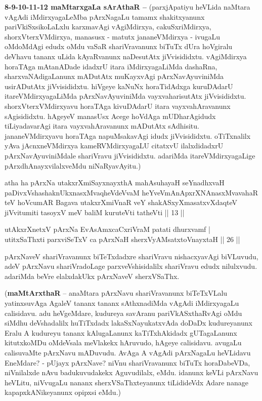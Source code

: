 \begin{artha}
\textbf{8-9-10-11-12 maMtarxgaLa sArAthaR --}
(parxjApatiyu heVLida naMtara vAgAdi iMdirxyagaLeMba pArxNagaLu tamamx shakitxyanunx pariVkiSxsikoLaLxlu karxmavAgi vAgiMdirxya, cakuSxriMdirxya, shorxVterxVMdirxya, manasusx - matutx jananeVMdirxya - ivugaLu oMdoMdAgi edudx oMdu vaSaR shariVravanunx biTuTx dUra hoVgiralu deVhavu tananx uLida kAyaRvanunx naDesutAtx jiVvisididxtu. vAgiMdirxya horaTAga mAtanADade idadxrU itara iMdirxyagaLiMda dashaRna, sharxvaNAdigaLanunx mADutAtx muKayxvAgi pArxNavAyuviniMda usirADutAtx jiVvisididxtu. hiVgeye kaNuNx horaTidAdxga kuruDAdarU itareVMdirxyagaLiMda pArxNavAyuviniMda vayxvaharisutAtx jiVvisididxtu. shorxVterxVMdirxyavu horaTAga kivuDAdarU itara vayxvahAravanunx sAgisididxtu. hAgeyeV manasUsx Acege hoVdAga mUDharAgidudx tiLiyadavarAgi itara vayxvahAravanunx mADutAtx sAdhisitu. jananeVMdirxyavu horaTAga napuMsakavAgi idudx jiVvisididxtu. oTiTxnalilx yAva jAcnxneVMdirxya kameRVMdirxyagaLU citatxvU ilalxdidadxrU pArxNavAyuviniMdale shariVravu jiVvisididxtu. adariMda itareVMdirxyagaLige pArxdhAnayxvilalxveMdu niNaRyavAyitu.)
\end{artha}

\begin{shl}
atha ha pArxNa utakxrXmiSayxnayxthA mahAsuhayaH seYnadhxvaH paDivxVshashaknUkxnasxMvaqheVdeVvaM heYveVmAnApxrXNAnasxMvavahaR teV hoVcumAR Bagava utakxrXmiVnaR veY shakASxyXmasatxvXdaqteV jiVvitumiti tasoyxV meV baliM kuruteVti tatheVti || 13 ||
\end{shl}


\begin{shl}
utAkxrXnetxV pArxNa EvAsAmxcaCxriVraM patati dhurxvamf | \\
utitxSaThxti parxviSeTxV ca pArxNaH sherxVyAMsatxtoV\s nayxtaH \hfill|| 26 || 
\end{shl}

\begin{artha}
pArxNaveV shariVravanunx biTeTxdadxre shariVravu nishacxyavAgi 
biVLuvudu, adeV pArxNavu shariVradoLage parxveVshisidalilx shariVravu 
edudx nilulxvudu. adariMda beVre elalxdakUkx pArxNaveV sherxVSaThx.
\end{artha}

\begin{artha}
(\textbf{maMtArxthaR} -- anaMtara pArxNavu shariVravanunx biTeTxVLalu 
yatinxsuvAga AgaleV tananx tananx sAthxnadiMda vAgAdi iMdirxyagaLu 
calisidavu. adu heVgeMdare, kudureya savAranu pariVkASxthaRvAgi oMdu 
siMdhu deVshadalilx huTiTxdadx lakaSxNayukatxvAda doDaDx kudureyanunx 
Eralu A kudureyu tananx kAlugaLanunx kaTiTxhAkidadx gUTagaLanunx 
kitutxkoMDu oMdeVsala meVlakekx hAruvudo, hAgeye calisidavu. avugaLu 
calisuvaMte pArxNavu mADuvudu. AvAga A vAgAdi pArxNagaLu heVLidavu 
EneMdare? - pUjayx pArxNave? niVnu shariVravanunx biTuTx horaDabeVDa, 
niVnilalxde nAvu badukuvudakekx Aguvudilalx, eMdu. idanunx keVLi 
pArxNavu heVLitu, niVvugaLu nananx sherxVSaThxteyanunx tiLidideVdx 
Adare nanage kapapxkANikeyanunx opipxsi eMdu.)
\end{artha}

